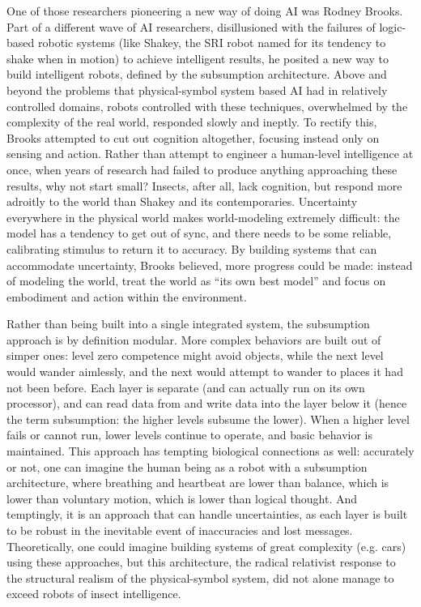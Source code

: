 One of those researchers pioneering a new way of doing AI was Rodney
Brooks. Part of a different wave of AI researchers, disillusioned with
the failures of logic-based robotic systems (like Shakey, the SRI
robot named for its tendency to shake when in motion)\cite[Ch. 10]{mccorduck} to
achieve intelligent results, he posited a new way to build intelligent
robots, defined by the subsumption architecture.\cite[p. 353]{mobilebrooks} Above and
beyond the problems that physical-symbol system based AI had in
relatively controlled domains, robots controlled with these
techniques, overwhelmed by the complexity of the real world, responded
slowly and ineptly. To rectify this, Brooks attempted to cut out
cognition altogether, focusing instead only on sensing and
action.\cite[Afterword]{mccorduck} Rather than attempt to engineer a
human-level intelligence at once, when years of research had failed to
produce anything approaching these results, why not start small?
Insects, after all, lack cognition, but respond more adroitly to the
world than Shakey and its contemporaries. Uncertainty everywhere in
the physical world makes world-modeling extremely difficult: the
model has a tendency to get out of sync, and there needs to be
some reliable, calibrating stimulus to return it to accuracy. By building systems that can
accommodate uncertainty, Brooks believed, more progress could be
made:\cite[p. 347]{mobilebrooks} instead of modeling the world, treat
the world as ``its own best model'' and focus on embodiment and action
within the environment.\cite[p. 256]{ekbia}

Rather than being built into a single integrated system, the
subsumption approach is by definition modular. More complex behaviors
are built out of simper ones: level zero competence might avoid objects,
while the next level would wander aimlessly, and the next would
attempt to wander to places it had not been before.\cite[p.
  351--352]{mobilebrooks} Each layer is separate (and can actually run 
on its own processor), and can read data from
and write data into the layer below it (hence the term subsumption: 
the higher levels subsume the lower). When a higher level fails or
cannot run, lower levels continue to operate, and basic behavior is
maintained.\cite[p. 355]{mobilebrooks} This approach has tempting
biological connections as well:
accurately or not, one can imagine the human being as a robot with a subsumption
architecture, where breathing and heartbeat are lower than balance,
which is lower than voluntary motion, which is lower than logical
thought. And temptingly, it is an approach that can handle
uncertainties, as each layer is built to be robust in the inevitable
event of inaccuracies and lost messages. Theoretically, one could
imagine building systems of great complexity (e.g. cars) using these approaches,
but this architecture, the radical relativist response to the
structural realism of the physical-symbol system, did not alone manage
to exceed robots of insect intelligence.

